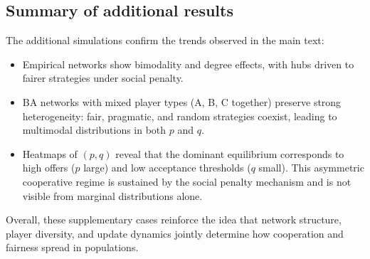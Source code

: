 \subsection*{Summary of additional results}
The additional simulations confirm the trends observed in the main text:
\begin{itemize}
    \item Empirical networks show bimodality and degree effects, with hubs driven
    to fairer strategies under social penalty.
    \item BA networks with mixed player types (A, B, C together) preserve strong
    heterogeneity: fair, pragmatic, and random strategies coexist, leading to
    multimodal distributions in both $p$ and $q$.
    \item Heatmaps of $(p,q)$ reveal that the dominant equilibrium corresponds to
    high offers ($p$ large) and low acceptance thresholds ($q$ small). This
    asymmetric cooperative regime is sustained by the social penalty mechanism
    and is not visible from marginal distributions alone.
\end{itemize}
Overall, these supplementary cases reinforce the idea that network structure,
player diversity, and update dynamics jointly determine how cooperation and
fairness spread in populations.


